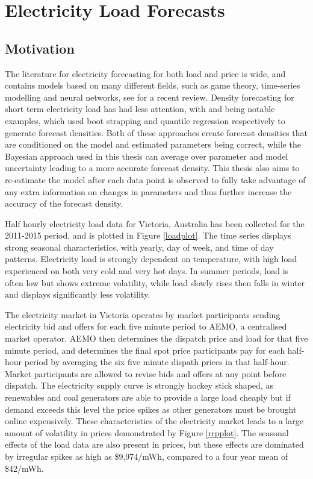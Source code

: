 \documentclass[12pt,a4paper]{article}%
\numberwithin{equation}{section}
\begin{document}
\section{Electricity Load Forecasts}
\subsection{Motivation}

The literature for electricity forecasting for both load and price is wide, and contains models based on many different fields, such as game theory, time-series modelling and neural networks, see \citet{Weron2014} for a recent review. Density forecasting for short term electricity load has had less attention, with \citet{Fan2012} and \citet{He2016} being notable examples, which used boot strapping and quantile regression respectively to generate forecast densities. Both of these approaches create forecast densities that are conditioned on the model and estimated parameters being correct, while the Bayesian approach used in this thesis can average over parameter and model uncertainty leading to a more accurate forecast density. This thesis also aims to re-estimate the model after each data point is observed to fully take advantage of any extra information on changes in parameters and thus further increase the accuracy of the forecast density. 

Half hourly electricity load data for Victoria, Australia has been collected for the 2011-2015 period, and is plotted in Figure \ref{loadplot}. The time series displays strong seasonal characteristics, with yearly, day of week, and time of day patterns. Electricity load is strongly dependent on temperature, with high load experienced on both very cold and very hot days. In summer periods, load is often low but shows extreme volatility, while load slowly rises then falls in winter and displays significantly less volatility. 

The electricity market in Victoria operates by market participants sending electricity bid and offers for each five minute period to  AEMO, a centralised market operator. AEMO then determines the dispatch price and load for that five minute period, and determines the final spot price participants pay for each half-hour period by averaging the six five minute dispath prices in that half-hour. Market participants are allowed to revise bids and offers at any point before dispatch. The electricity supply curve is strongly hockey stick shaped, as renewables and coal generators are able to provide a large load cheaply but if demand exceeds this level the price spikes as other generators must be brought online expensively. These characteristics of the electricity market leads to a large amount of volatility in prices demonstrated by Figure \ref{rrpplot}. The seasonal effects of the load data are also present in prices, but these effects are dominated by irregular spikes as high as \$9,974/mWh, compared to a four year mean of \$42/mWh.
\end{document}
